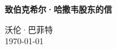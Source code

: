 \documentclass[12pt, a4paper, UTF8, fontset=adobe, oneside]{ctexbook} %
\begin{document}
\frontmatter
\begin{titlepage}
\begin{center}

\vspace*{5cm}
{\huge \bfseries 致伯克希尔·哈撒韦股东的信}\\[0.4cm]

\vspace{12cm}

{\large 沃伦·巴菲特} \\[1cm]
{\large \today}

\end{center}
\end{titlepage}

{
\hypersetup{linkcolor=black} %
\tableofcontents %
}

\mainmatter%






\end{document}
